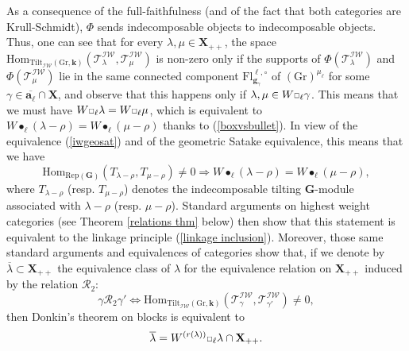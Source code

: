 \documentclass[11pt]{amsart}
\theoremstyle{plain}
\theoremstyle{remark}
\newcommand{\car}{\mbox{\relsize{-5}$\Box$}}
\numberwithin{equation}{section}
\begin{document}
	As a consequence of the full-faithfulness (and of the fact that both categories are Krull-Schmidt), $\Phi$ sends indecomposable objects to indecomposable objects. Thus, one can see that for every $\lambda,\mu\in\mathbf{X}_{++}$, the space $\mathrm{Hom}_{\mathrm{Tilt}_{\mathcal{IW}}(\mathrm{Gr},\mathbf{k})}(\mathscr{T}^{\mathcal{IW}}_{\lambda},\mathscr{T}^{\mathcal{IW}}_{\mu})$ is non-zero only if the supports of $\Phi(\mathscr{T}^{\mathcal{IW}}_{\lambda})$ and $\Phi(\mathscr{T}^{\mathcal{IW}}_{\mu})$ lie in the same connected component $\mathrm{Fl}^{\ell,\circ}_{\mathbf{g}_{\gamma}}$ of $(\mathrm{Gr})^{\mu_\ell}$ for some $\gamma\in \overline{\mathbf{a}_\ell}\cap\mathbf{X}$, and observe that this happens only if $\lambda,\mu\in W\car_\ell\gamma$. This means that we must have $W\car_\ell\lambda= W\car_\ell\mu$, which is equivalent to $W\bullet_\ell(\lambda-\rho)= W\bullet_\ell(\mu-\rho)$ thanks to (\ref{boxvsbullet}). In view of the equivalence (\ref{iwgeosat}) and of the geometric Satake equivalence, this means that we have
	$$\mathrm{Hom}_{\mathrm{Rep}(\mathbf{G})}(T_{\lambda-\rho},T_{\mu-\rho})\neq0\Longrightarrow W\bullet_\ell(\lambda-\rho)=W\bullet_\ell(\mu-\rho), $$
	where $T_{\lambda-\rho}$ (resp. $T_{\mu-\rho}$) denotes the indecomposable tilting $\mathbf{G}$-module associated with $\lambda-\rho$ (resp. $\mu-\rho$). Standard arguments on highest weight categories (see Theorem \ref{relations thm} below) then show that this statement is equivalent to the linkage principle (\ref{linkage inclusion}). Moreover, those same standard arguments and equivalences of categories show that, if we denote by $\overline{\lambda}\subset\mathbf{X}_{++}$ the equivalence class of $\lambda$ for the equivalence relation on $\mathbf{X}_{++}$ induced by the relation $\mathscr{R}_2$:
	$$\gamma\mathscr{R}_2\gamma'\Longleftrightarrow  \mathrm{Hom}_{\mathrm{Tilt}_{\mathcal{IW}}(\mathrm{Gr},\mathbf{k})}(\mathscr{T}^{\mathcal{IW}}_{\gamma},\mathscr{T}^{\mathcal{IW}}_{\gamma'})\neq 0,$$
	then Donkin's theorem on blocks is equivalent to
	$$\overline{\lambda}=W^{(r(\lambda))}\car_\ell\lambda\cap\mathbf{X}_{++}. $$
\end{document}
